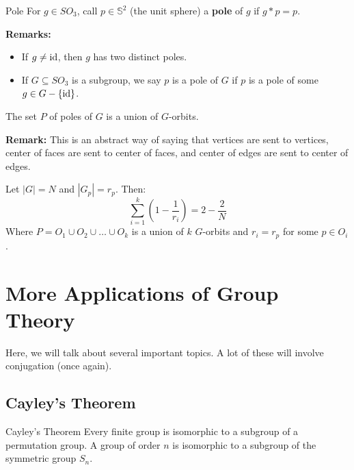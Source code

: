 \documentclass[letterpaper]{article}
\begin{document}
\begin{definition}{Pole}{}
    For $g \in SO_3$, call $p \in \mathbb{S}^2$ (the unit sphere) a \textbf{pole} of $g$ if $g * p = p$. 
\end{definition}
\textbf{Remarks:}
\begin{itemize}
    \item If $g \neq \operatorname{id}$, then $g$ has two distinct poles. 
    \item If $G \subseteq SO_3$ is a subgroup, we say $p$ is a pole of $G$ if $p$ is a pole of some $g \in G - \{\operatorname{id}\}$. 
\end{itemize} 

\begin{lemma}{}{}
    The set $P$ of poles of $G$ is a union of $G$-orbits. 
\end{lemma}
\textbf{Remark:} This is an abstract way of saying that vertices are sent to vertices, center of faces are sent to center of faces, and center of edges are sent to center of edges. 

\begin{lemma}{}{}
    Let $|G| = N$ and $|G_p| = r_p$. Then: 
    \[\sum_{i = 1}^{k} \left(1 - \frac{1}{r_i}\right) = 2 - \frac{2}{N}\]
    Where $P = O_1 \cup O_2 \cup \dots \cup O_k$ is a union of $k$ $G$-orbits and $r_i = r_p$ for some $p \in O_i$. 
\end{lemma}

















\newpage 
\section{More Applications of Group Theory}
Here, we will talk about several important topics. A lot of these will involve conjugation (once again). 

\subsection{Cayley's Theorem}
\begin{theorem}{Cayley's Theorem}{}
    Every finite group is isomorphic to a subgroup of a permutation group. A group of order $n$ is isomorphic to a subgroup of the symmetric group $S_n$. 
\end{theorem}
\end{document}
